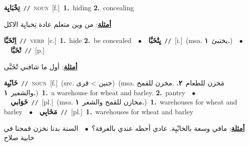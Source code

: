 \documentclass[10pt,a4paper,twoside]{article} %
\begin{document}
\begin{multicols}{2}
{\setlength\topsep{0pt}\textbf{\foreignlanguage{arabic}{تِخْبَايِة}}\ {\color{gray}\texttt{//}\color{black}}\ \textsc{noun}\ [f.]\ \textbf{1.}~hiding  \textbf{2.}~concealing\  \begin{flushright}\color{gray}\foreignlanguage{arabic}{\textbf{\underline{\foreignlanguage{arabic}{أمثلة}}}: من وين متعلم عادة تِخبايِة الاكل}\end{flushright}\color{black}} \vspace{2mm}

{\setlength\topsep{0pt}\textbf{\foreignlanguage{arabic}{اِتْخَبَّا}}\ {\color{gray}\texttt{//}\color{black}}\ \textsc{verb}\ [c.]\ \textbf{1.}~hide  \textbf{2.}~be concealed\ \ $\bullet$\ \ \setlength\topsep{0pt}\textbf{\foreignlanguage{arabic}{يِتْخَبَّا}}\ {\color{gray}\texttt{//}\color{black}}\ [i.]\ \color{gray}(msa. \foreignlanguage{arabic}{يختبئ}~\foreignlanguage{arabic}{\textbf{١.}})\color{black}\ \ $\bullet$\ \ \setlength\topsep{0pt}\textbf{\foreignlanguage{arabic}{تْخَبَّا}}\ {\color{gray}\texttt{//}\color{black}}\ [p.]\  \begin{flushright}\color{gray}\foreignlanguage{arabic}{\textbf{\underline{\foreignlanguage{arabic}{أمثلة}}}: أول ما شافني تْخَبَّى}\end{flushright}\color{black}} \vspace{2mm}

{\setlength\topsep{0pt}\textbf{\foreignlanguage{arabic}{خَابْيِة}}\ {\color{gray}\texttt{//}\color{black}}\ \textsc{noun}\ [f.]\ (src. \color{gray}\foreignlanguage{arabic}{جنين > قرى}\color{black})\ \color{gray}(msa. \foreignlanguage{arabic}{مَخزن للطعام}~\foreignlanguage{arabic}{\textbf{٢.}}  .\foreignlanguage{arabic}{مخرن للقمح والشعير}~\foreignlanguage{arabic}{\textbf{١.}})\color{black}\ \textbf{1.}~a warehouse for wheat and barley.  \textbf{2.}~pantry\ \ $\bullet$\ \ \setlength\topsep{0pt}\textbf{\foreignlanguage{arabic}{خَوَابي}}\ {\color{gray}\texttt{//}\color{black}}\ [pl.]\ \color{gray}(msa. \foreignlanguage{arabic}{مخازن للقمح والشعر}~\foreignlanguage{arabic}{\textbf{١.}})\color{black}\ \textbf{1.}~warehouses for wheat and barley\ \ $\bullet$\ \ \setlength\topsep{0pt}\textbf{\foreignlanguage{arabic}{مَخَابِي}}\ {\color{gray}\texttt{//}\color{black}}\ [pl.]\ \textbf{1.}~warehouses for wheat and barley\  \begin{flushright}\color{gray}\foreignlanguage{arabic}{\textbf{\underline{\foreignlanguage{arabic}{أمثلة}}}: مافي وسعة بالخابْيِة. عادي أحطه عندي بالغرفة؟\ $\bullet$\ \  السنة بدنا نخزن قمحنا في خابية صلاح}\end{flushright}\color{black}} \vspace{2mm}


\end{multicols}
\end{document}
